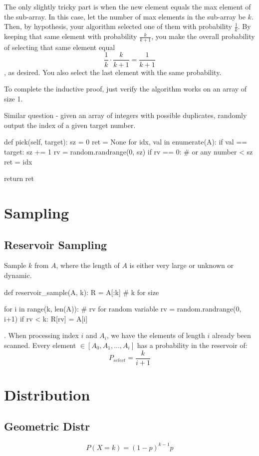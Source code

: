 The only slightly tricky part is when the new element equals the max element of the sub-array. In this case, let the number of max elements in the sub-array be $k$. Then, by hypothesis, your algorithm selected one of them with probability $\frac{1}{k}$. By keeping that same element with probability $\frac{k}{k+1}$, you make the overall probability of selecting that same element equal $$\frac{1}{k} \cdot \frac{k}{k+1} = \frac{1}{k+1}$$, as desired. You also select the last element with the same probability.

To complete the inductive proof, just verify the algorithm works on an array of size 1.

 Similar question - given an array of integers with possible duplicates, randomly output the index of a given target number.
\begin{python}
def pick(self, target):
    sz = 0
    ret = None
    for idx, val in enumerate(A):
        if val == target:
            sz += 1
            rv = random.randrange(0, sz)
            if rv == 0:  # or any number < sz
                ret = idx

    return ret
\end{python}

\section{Sampling}
\subsection{Reservoir Sampling}
Sample $k$ from $A$, where the length of $A$ is either very large or unknown or dynamic. 
\begin{python}
def reservoir_sample(A, k):
  R = A[:k]  # k for size
  
  for i in range(k, len(A)):
    # rv for random variable
    rv = random.randrange(0, i+1)
    if rv < k:
      R[rv] = A[i]
\end{python}
. 
When processing index $i$ and $A_i$, we have the elements of length $i$ already been scanned. Every element $\in [A_0, A_1, ..., A_i]$ has a probability in the reservoir of:
$$
P_{select} = \frac{k}{i+1}
$$

\section{Distribution}
\subsection{Geometric Distr}
$$
P(X=k) = (1-p)^{k-1}p
$$

